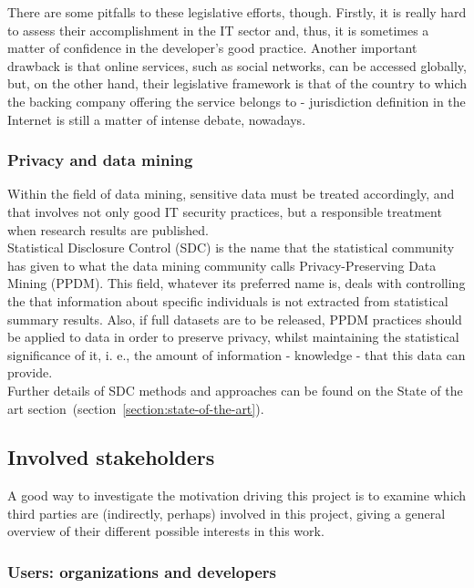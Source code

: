 There are some pitfalls to these legislative efforts, though. Firstly, it is really hard to assess their accomplishment in the IT sector and, thus, it is sometimes a matter of confidence in the developer’s good practice. Another important drawback is that online services, such as social networks, can be accessed globally, but, on the other hand, their legislative framework is that of the country to which the backing company offering the service belongs to - jurisdiction definition in the Internet is still a matter of intense debate, nowadays.

\subsubsection{Privacy and data mining}

Within the field of data mining, sensitive data must be treated accordingly, and that involves not only good IT security practices, but a responsible treatment when research results are published.\\

Statistical Disclosure Control (SDC) is the name that the statistical community has given to what the data mining community calls Privacy-Preserving Data Mining (PPDM). This field, whatever its preferred name is, deals with controlling the that information about specific individuals is not extracted from statistical summary results. Also, if full datasets are to be released, PPDM practices should be applied to data in order to preserve privacy, whilst maintaining the statistical significance of it, i. e., the amount of information - knowledge - that this data can provide.\\

Further details of SDC methods and approaches can be found on the State of the art section~(section~\ref{section:state-of-the-art}).

\subsection{Involved stakeholders}

A good way to investigate the motivation driving this project is to examine which third parties are (indirectly, perhaps) involved in this project, giving a general overview of their different possible interests in this work.

\subsubsection{Users: organizations and developers}

